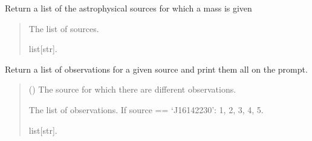 \documentclass[letterpaper,10pt,english]{sphinxmanual}
\begin{document}
\begin{fulllineitems}
\label{\detokenize{source/api/setup_astro_masses:nucleardatapy.setup_astro_masses.astro_masses}}
\pysigstartsignatures
\pysiglinewithargsret
{}
{}
{}
\pysigstopsignatures
\sphinxAtStartPar
Return a list of the astrophysical sources for which a mass is given
\begin{quote}\begin{description}
\sphinxAtStartPar
The list of sources.

\sphinxAtStartPar
list{[}str{]}.

\end{description}\end{quote}

\end{fulllineitems}


\begin{fulllineitems}
\label{\detokenize{source/api/setup_astro_masses:nucleardatapy.setup_astro_masses.astro_masses_source}}
\pysigstartsignatures
\pysiglinewithargsret
{}
{}
{}
\pysigstopsignatures
\sphinxAtStartPar
Return a list of observations for a given source and print them all on the prompt.
\begin{quote}\begin{description}
\sphinxAtStartPar
{} () \textendash{} The source for which there are different observations.

\sphinxAtStartPar
The list of observations.     If source == ‘J1614\textendash{}2230’: 1, 2, 3, 4, 5.

\sphinxAtStartPar
list{[}str{]}.

\end{description}\end{quote}

\end{fulllineitems}
\end{document}
